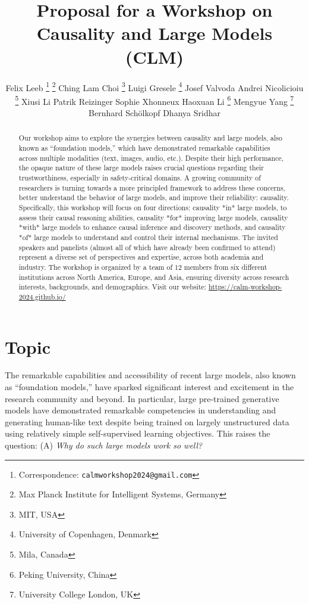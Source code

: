 \documentclass{article}
\title{Proposal for a Workshop on \\
Causality and Large Models (C\emoji{heart}LM)}
\author{%
    Felix Leeb \thanks{Correspondence: \texttt{calmworkshop2024@gmail.com}} 
    \thanks{Max Planck Institute for Intelligent Systems, Germany}
    \And
    Ching Lam Choi \footnotemark[1] \thanks{MIT, USA}
    \And
    Luigi Gresele \thanks{University of Copenhagen, Denmark}
    \And
    Josef Valvoda \footnotemark[4]
    \And
    Andrei Nicolicioiu \thanks{Mila, Canada}
    \And
    Xiusi Li \footnotemark[5]
    \And
    Patrik Reizinger \footnotemark[2]
    \And
    Sophie Xhonneux \footnotemark[5]
    \And
    Haoxuan Li \thanks{Peking University, China}
    \And
    Mengyue Yang \thanks{University College London, UK}
    \And
    Bernhard Schölkopf \footnotemark[2]
    \And
    Dhanya Sridhar \footnotemark[5]
}
\begin{document}
\maketitle


\begin{abstract}
    Our workshop aims to explore the synergies between causality and large models, also known as ``foundation models,'' which have demonstrated remarkable capabilities across multiple modalities (text, images, audio, etc.). Despite their high performance, the opaque nature of these large models raises crucial questions regarding their trustworthiness, especially in safety-critical domains. 
    A growing community of researchers is turning towards a more principled framework to address these concerns, better understand the behavior of large models, and improve their reliability: causality.
    Specifically, this workshop will focus on four directions: causality *in* large models, to assess their causal reasoning abilities, causality *for* improving large models, causality *with* large models to enhance causal inference and discovery methods, and causality *of* large models to understand and control their internal mechanisms. 
    The invited speakers and panelists (almost all of which have already been confirmed to attend) represent a diverse set of perspectives and expertise, across both academia and industry.
    The workshop is organized by a team of 12 members from six different institutions across North America, Europe, and Asia, ensuring diversity across research interests, backgrounds, and demographics. Visit our website: \url{https://calm-workshop-2024.github.io/}

\end{abstract}



\section{Topic}

The remarkable capabilities and accessibility of recent large models, also known as ``foundation models,'' have sparked significant interest and excitement in the research community and beyond. In particular, large pre-trained generative models have demonstrated remarkable competencies in understanding and generating human-like text despite being trained on largely unstructured data using relatively simple self-supervised learning objectives. This raises the question: (A) \textit{Why do such large models work so well?} %
\end{document}
